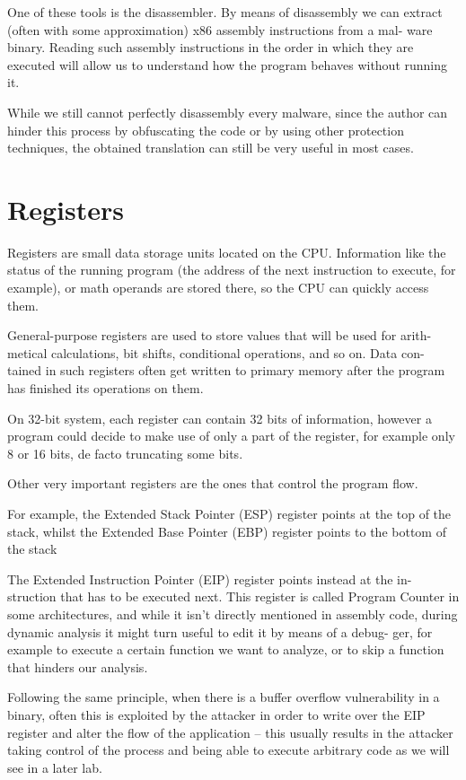 \documentclass[]{project_plan}
\begin{document}
One of these tools is the disassembler. By means of disassembly we can
extract (often with some approximation) x86 assembly instructions from a mal-
ware binary. Reading such assembly instructions in the order in which they are
executed will allow us to understand how the program behaves without running
it.

While we still cannot perfectly disassembly every malware, since the author
can hinder this process by obfuscating the code or by using other protection
techniques, the obtained translation can still be very useful in most cases.

\section{Registers}
Registers are small data storage units located on the CPU. Information like the
status of the running program (the address of the next instruction to execute,
for example), or math operands are stored there, so the CPU can quickly access
them.

General-purpose registers are used to store values that will be used for arith-
metical calculations, bit shifts, conditional operations, and so on. Data con-
tained in such registers often get written to primary memory after the program
has finished its operations on them.

On 32-bit system, each register can contain
32 bits of information, however a program could decide to make use of only a
part of the register, for example only 8 or 16 bits, de facto truncating some bits.

Other very important registers are the ones that control the program flow.

For example, the Extended Stack Pointer (ESP) register points at the top of the
stack, whilst the Extended Base Pointer (EBP) register points to the bottom of
the stack

The Extended Instruction Pointer (EIP) register points instead at the in-
struction that has to be executed next. This register is called Program Counter
in some architectures, and while it isn’t directly mentioned in assembly code,
during dynamic analysis it might turn useful to edit it by means of a debug-
ger, for example to execute a certain function we want to analyze, or to skip a
function that hinders our analysis.

Following the same principle, when there is a buffer overflow vulnerability
in a binary, often this is exploited by the attacker in order to write over the
EIP register and alter the flow of the application – this usually results in the
attacker taking control of the process and being able to execute arbitrary code
as we will see in a later lab.
\end{document}

